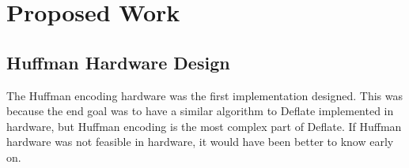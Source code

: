 \documentclass[doublespace,draft,nopageskip]{VTthesis} %
\begin{document}




\chapter{Proposed Work} \label{ch:proposed_work}
\section{Huffman Hardware Design}\label{se:huffman_hardware_design}
The Huffman encoding hardware was the first implementation designed. This was because the end goal was to have a similar algorithm to Deflate implemented in hardware, but Huffman encoding is the most complex part of Deflate. If Huffman hardware was not feasible in hardware, it would have been better to know early on.
\end{document}
